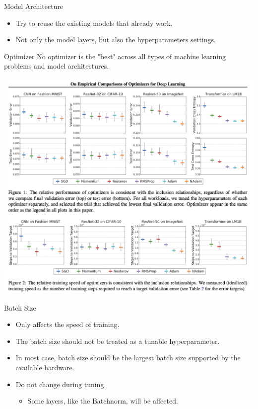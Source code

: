 \documentclass[aspectratio=1610,xcolor={dvipsnames},hyperref={colorlinks,unicode,linkcolor=violet,anchorcolor=BlueViolet,citecolor=YellowOrange,filecolor=black,urlcolor=Aquamarine}]{beamer}
\begin{document}
\begin{frame}[label={sec:orgfcae7ae}]{Model Architecture}
\begin{itemize}
\item \large Try to reuse the existing models that already work.

\item Not only the model layers, but also the hyperparameters settings.
\end{itemize}
\end{frame}

\begin{frame}[label={sec:orgb5e8f76}]{Optimizer}
No optimizer is the "best" across all types of machine learning problems and model architectures. 

\begin{center}
\includegraphics[width=.9\linewidth]{./p2.png}
\end{center}
\end{frame}

\begin{frame}[label={sec:org7aa129d}]{Batch Size}
\begin{itemize}
\item Only affects the speed of training.
\item The batch size should not be treated as a tunable hyperparameter. 
\item In most case, batch size should be the largest batch size supported by the available hardware.
\item Do not change during tuning.
\begin{itemize}
\item Some layers, like the Batchnorm, will be affected.
\end{itemize}
\end{itemize}
\end{frame}
\end{document}
